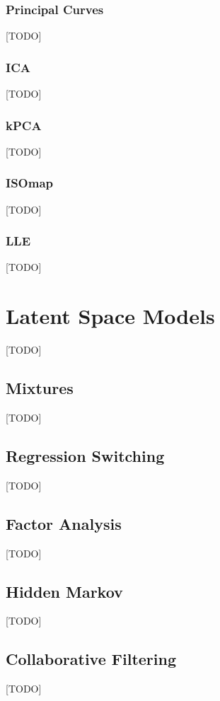 \documentclass[12pt,a4paper]{article}
\theoremstyle{plain}
\theoremstyle{definition}
\begin{document}
\subsubsection{Principal Curves}
[TODO]

\subsubsection{ICA}
[TODO]

\subsubsection{kPCA}
[TODO]

\subsubsection{ISOmap}
[TODO]


\subsubsection{LLE}
[TODO]



\section{Latent Space Models}
\label{sec:latent_space}
[TODO]


\subsection{Mixtures}
[TODO]


\subsection{Regression Switching}
[TODO]



\subsection{Factor Analysis}
[TODO]


\subsection{Hidden Markov}
[TODO]


\subsection{Collaborative Filtering}
[TODO]







\newpage
\listofalgorithms




\end{document}
